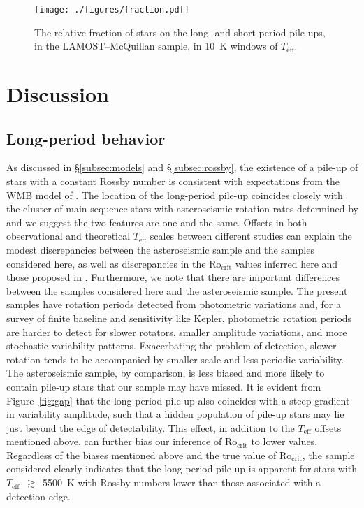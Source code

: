 \documentclass[linenumbers,tighten,trackchanges,twocolumn]{aastex631}
\newcommand{\rocrit}{$\mathrm{Ro_{crit}}$\xspace}
\newcommand{\lamostmcq}{LAMOST--McQuillan\xspace}
\newcommand{\teffmin}{5500~K\xspace}
\newcommand{\teff}{\ensuremath{T_{\mathrm{eff}}}\xspace}
\begin{document}
\begin{figure}
    \centering
    \texttt{[image: ./figures/fraction.pdf]}
    \caption{The relative fraction of stars on the long- and short-period pile-ups, in the \lamostmcq sample, in 10~K windows of \teff.}
    \label{fig:fraction}
\end{figure}


\section{Discussion} \label{sec:discussion}

\subsection{Long-period behavior} \label{subsec:longperiod}

As discussed in \S\ref{subsec:models} and \S\ref{subsec:rossby}, the existence of a pile-up of stars with a constant Rossby number is consistent with expectations from the WMB model of \citet{vanSaders2016, vanSaders2019}. The location of the long-period pile-up coincides closely with the cluster of main-sequence stars with asteroseismic rotation rates determined by \citet{Hall2021} and we suggest the two features are one and the same. Offsets in both observational and theoretical \teff scales between different studies can explain the modest discrepancies between the asteroseismic sample and the samples considered here, as well as discrepancies in the \rocrit values inferred here and those proposed in \citet{vanSaders2019}. {\color{red} Furthermore, we note that there are important differences between the samples considered here and the \citet{Hall2021} asteroseismic sample. The present samples have rotation periods detected from photometric variations and, for a survey of finite baseline and sensitivity like Kepler, photometric rotation periods are harder to detect for slower rotators, smaller amplitude variations, and more stochastic variability patterns. Exacerbating the problem of detection, slower rotation tends to be accompanied by smaller-scale and less periodic variability. The asteroseismic sample, by comparison, is less biased and more likely to contain pile-up stars that our sample may have missed. It is evident from Figure~\ref{fig:gap} that the long-period pile-up also coincides with a steep gradient in variability amplitude, such that a hidden population of pile-up stars may lie just beyond the edge of detectability. This effect, in addition to the \teff offsets mentioned above, can further bias our inference of \rocrit to lower values. Regardless of the biases mentioned above and the true value of \rocrit, the sample considered clearly indicates that the long-period pile-up is apparent for stars with \teff~$\gtrsim$~\teffmin with Rossby numbers lower than those associated with a detection edge.}
\end{document}
